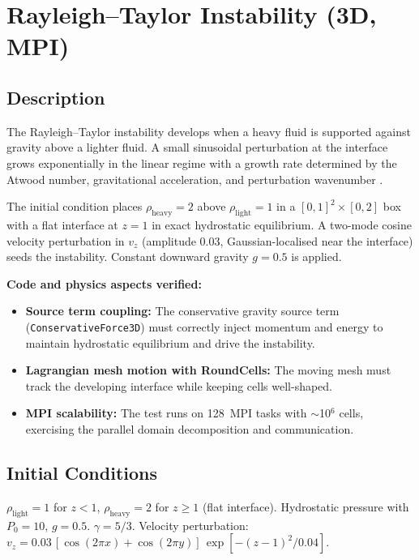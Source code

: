\documentclass[11pt,a4paper]{article}
\begin{document}
\newpage

\section{Rayleigh--Taylor Instability (3D, MPI)}
\label{sec:rayleigh_taylor_mpi}

\subsection*{Description}
The Rayleigh--Taylor instability \cite{rayleigh1883,taylor1950rt} develops when a heavy fluid is supported against gravity above a lighter fluid. A small sinusoidal perturbation at the interface grows exponentially in the linear regime with a growth rate determined by the Atwood number, gravitational acceleration, and perturbation wavenumber \cite{chandrasekhar1961}.

The initial condition places $\rho_{\mathrm{heavy}}=2$ above $\rho_{\mathrm{light}}=1$ in a $[0,1]^2 \times [0,2]$ box with a flat interface at $z=1$ in exact hydrostatic equilibrium. A two-mode cosine velocity perturbation in $v_z$ (amplitude $0.03$, Gaussian-localised near the interface) seeds the instability. Constant downward gravity $g=0.5$ is applied.

\textbf{Code and physics aspects verified:}
\begin{itemize}
  \item \textbf{Source term coupling:} The conservative gravity source term (\texttt{ConservativeForce3D}) must correctly inject momentum and energy to maintain hydrostatic equilibrium and drive the instability.
  \item \textbf{Lagrangian mesh motion with RoundCells:} The moving mesh must track the developing interface while keeping cells well-shaped.
  \item \textbf{MPI scalability:} The test runs on 128~MPI tasks with $\sim$10$^6$ cells, exercising the parallel domain decomposition and communication.
\end{itemize}

\subsection*{Initial Conditions}
$\rho_{\mathrm{light}}=1$ for $z < 1$, $\rho_{\mathrm{heavy}}=2$ for $z \geq 1$ (flat interface). Hydrostatic pressure with $P_0=10$, $g=0.5$. $\gamma=5/3$. Velocity perturbation: $v_z = 0.03\,[\cos(2\pi x) + \cos(2\pi y)]\,\exp[-(z-1)^2/0.04]$.
\end{document}
